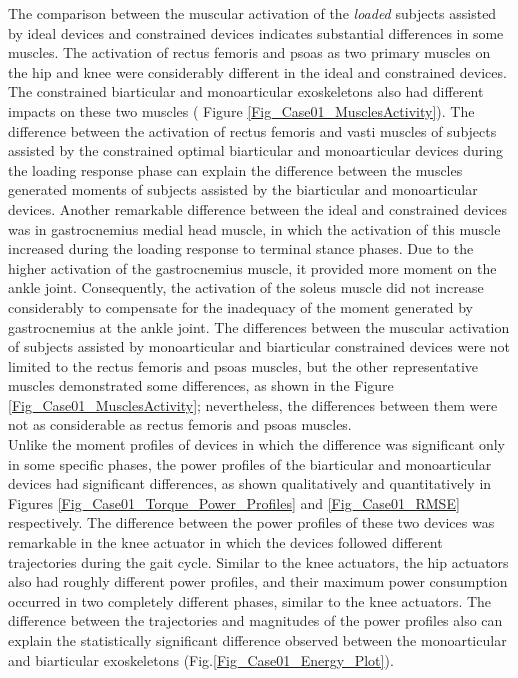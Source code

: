 \documentclass[10pt,letterpaper]{article}
\begin{document}
The comparison between the muscular activation of the {\it loaded} subjects assisted by ideal devices and constrained devices indicates substantial differences in some muscles. The activation of rectus femoris and psoas as two primary muscles on the hip and knee were considerably different in the ideal and constrained devices.  The constrained biarticular and monoarticular exoskeletons also had different impacts on these two muscles ( Figure \ref{Fig_Case01_MusclesActivity}). The difference between the activation of rectus femoris and vasti muscles of subjects assisted by the constrained optimal biarticular and monoarticular devices during the loading response phase can explain the difference between the muscles generated moments of subjects assisted by the biarticular and monoarticular devices. Another remarkable difference between the ideal and constrained devices was in gastrocnemius medial head muscle, in which the activation of this muscle increased during the loading response to terminal stance phases. Due to the higher activation of the gastrocnemius muscle, it provided more moment on the ankle joint. Consequently, the activation of the soleus muscle did not increase considerably to compensate for the inadequacy of the moment generated by gastrocnemius at the ankle joint.
The differences between the muscular activation of subjects assisted by monoarticular and biarticular constrained devices were not limited to the rectus femoris and psoas muscles, but the other representative muscles demonstrated some differences, as shown in the Figure \ref{Fig_Case01_MusclesActivity}; nevertheless, the differences between them were not as considerable as rectus femoris and psoas muscles.\\
Unlike the moment profiles of devices in which the difference was significant only in some specific phases, the power profiles of the biarticular and monoarticular devices had significant differences, as shown qualitatively and quantitatively in Figures \ref{Fig_Case01_Torque_Power_Profiles} and \ref{Fig_Case01_RMSE} respectively. The difference between the power profiles of these two devices was remarkable in the knee actuator in which the devices followed different trajectories during the gait cycle. Similar to the knee actuators, the hip actuators also had roughly different power profiles, and their maximum power consumption occurred in two completely different phases, similar to the knee actuators.  The difference between the trajectories and magnitudes of the power profiles also can explain the statistically significant difference observed between the monoarticular and biarticular exoskeletons (Fig.\ref{Fig_Case01_Energy_Plot}).\\
\end{document}
